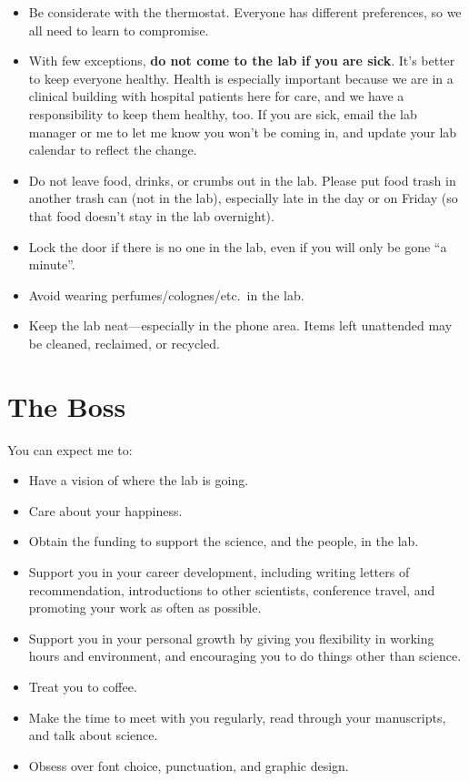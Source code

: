 \documentclass[letterpaper,12pt,oneside]{memoir}
\begin{document}
\begin{itemize}
\item Be considerate with the thermostat. Everyone has different preferences, so we all need to learn to compromise.
\item With few exceptions, \textbf{do not come to the lab if you are sick}. It's better to keep everyone healthy. Health is especially important because we are in a clinical building with hospital patients here for care, and we have a responsibility to keep them healthy, too. If you are sick, email the lab manager or me to let me know you won't be coming in, and update your lab calendar to reflect the change.
\item Do not leave food, drinks, or crumbs out in the lab. Please put food trash in another trash can (not in the lab), especially late in the day or on Friday (so that food doesn't stay in the lab overnight).
\item Lock the door if there is no one in the lab, even if you will only be gone ``a minute''.
\item Avoid wearing perfumes/colognes/etc.\ in the lab.
\item Keep the lab neat---especially in the phone area. Items left unattended may be cleaned, reclaimed, or recycled.
\end{itemize}


\section{The Boss}

You can expect me to:

\begin{itemize}
\item Have a vision of where the lab is going.
\item Care about your happiness.
\item Obtain the funding to support the science, and the people, in the lab.
\item Support you in your career development, including writing letters of recommendation, introductions to other scientists, conference travel, and promoting your work as often as possible.
\item Support you in your personal growth by giving you flexibility in working hours and environment, and encouraging you to do things other than science.
\item Treat you to coffee.
\item Make the time to meet with you regularly, read through your manuscripts, and talk about science.
\item Obsess over font choice, punctuation, and graphic design.
\end{itemize}
\end{document}
